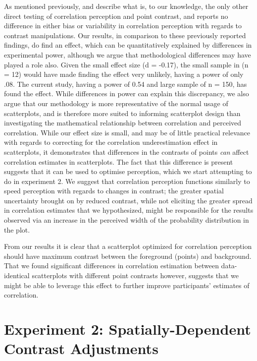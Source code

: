 \documentclass[preprint, 3p,
authoryear]{elsarticle} %
\begin{document}
As mentioned previously, \citet{rensink_2012} and \citet{rensink_2014}
describe what is, to our knowledge, the only other direct testing of
correlation perception and point contrast, and reports no difference in
either bias or variability in correlation perception with regards to
contrast manipulations. Our results, in comparison to these previously
reported findings, do find an effect, which can be quantitatively
explained by differences in experimental power, although we argue that
methodological differences may have played a role also. Given the small
effect size (d = -0.17), the small sample in \citet{rensink_2014} (n =
12) would have made finding the effect very unlikely, having a power of
only .08. The current study, having a power of 0.54 and large sample of
n = 150, has found the effect. While differences in power can explain
this discrepancy, we also argue that our methodology is more
representative of the normal usage of scatterplots, and is therefore
more suited to informing scatterplot design than investigating the
mathematical relationship between correlation and perceived correlation.
While our effect size is small, and may be of little practical relevance
with regards to correcting for the correlation underestimation effect in
scatterplots, it demonstrates that differences in the contrasts of
points \emph{can} affect correlation estimates in scatterplots. The fact
that this difference is present suggests that it can be used to optimise
perception, which we start attempting to do in experiment 2. We suggest
that correlation perception functions similarly to speed perception
\citep{champion_2017} with regards to changes in contrast; the greater
spatial uncertainty brought on by reduced contrast, while not eliciting
the greater spread in correlation estimates that we hypothesized, might
be responsible for the results observed via an increase in the perceived
width of the probability distribution in the plot.

From our results it is clear that a scatterplot optimized for
correlation perception should have maximum contrast between the
foreground (points) and background. That we found significant
differences in correlation estimation between data-identical
scatterplots with different point contrasts however, suggests that we
might be able to leverage this effect to further improve participants'
estimates of correlation.

\hypertarget{experiment-2-spatially-dependent-contrast-adjustments}{%
\section{Experiment 2: Spatially-Dependent Contrast
Adjustments}\label{experiment-2-spatially-dependent-contrast-adjustments}}
\end{document}
